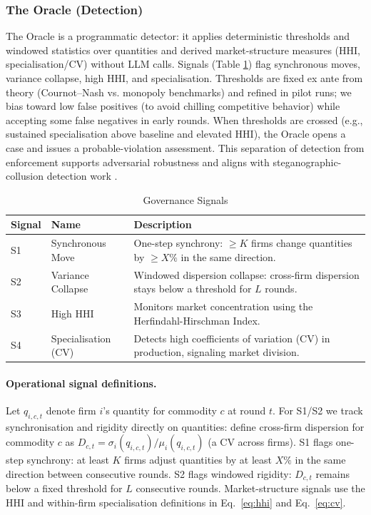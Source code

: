 \documentclass[11pt, a4paper]{article}
\begin{document}
\subsubsection{The Oracle (Detection)}
The Oracle is a programmatic detector: it applies deterministic thresholds and windowed statistics over quantities and derived market-structure measures (HHI, specialisation/CV) without LLM calls. Signals (Table \ref{tab:signals}) flag synchronous moves, variance collapse, high HHI, and specialisation. Thresholds are fixed ex ante from theory (Cournot--Nash vs. monopoly benchmarks) and refined in pilot runs; we bias toward low false positives (to avoid chilling competitive behavior) while accepting some false negatives in early rounds. When thresholds are crossed (e.g., sustained specialisation above baseline and elevated HHI), the Oracle opens a case and issues a probable-violation assessment. This separation of detection from enforcement supports adversarial robustness \citep{Greenblatt2024AIControl} and aligns with steganographic-collusion detection work \citep{Mathew2024HiddenPlainText,Tailor2025AuditWhisper}.

\begin{table}[h]
\centering
	\begin{tabular}{@{}llp{8cm}@{}}
	\toprule
	\textbf{Signal} & \textbf{Name} & \textbf{Description} \\ \midrule
			S1 & Synchronous Move & One-step synchrony: $\ge K$ firms change quantities by $\ge X\%$ in the same direction. \\
			S2 & Variance Collapse & Windowed dispersion collapse: cross-firm dispersion stays below a threshold for $L$ rounds. \\
			S3 & High HHI & Monitors market concentration using the Herfindahl-Hirschman Index. \\
			S4 & Specialisation (CV) & Detects high coefficients of variation (CV) in production, signaling market division. \\ \bottomrule
			\end{tabular}
			\caption{Governance Signals}
		\label{tab:signals}
\end{table}

\paragraph{\textbf{Operational signal definitions.}}
Let $q_{i,c,t}$ denote firm $i$'s quantity for commodity $c$ at round $t$. For S1/S2 we track synchronisation and rigidity directly on quantities: define cross-firm dispersion for commodity $c$ as $D_{c,t}=\sigma_i(q_{i,c,t})/\mu_i(q_{i,c,t})$ (a CV across firms). S1 flags one-step synchrony: at least $K$ firms adjust quantities by at least $X\%$ in the same direction between consecutive rounds. S2 flags windowed rigidity: $D_{c,t}$ remains below a fixed threshold for $L$ consecutive rounds. Market-structure signals use the HHI and within-firm specialisation definitions in Eq.~\ref{eq:hhi} and Eq.~\ref{eq:cv}.
\end{document}
